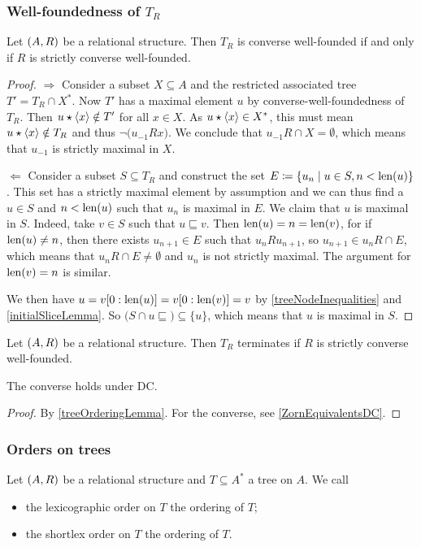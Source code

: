 \subsubsection{Well-foundedness of $T_R$}
\begin{proposition}
Let $\sSet{A, R}$ be a relational structure. Then $T_R$ is converse well-founded \textup{if and only if} $R$ is strictly converse well-founded.
\end{proposition}
\begin{proof}
$\boxed{\Rightarrow}$ Consider a subset $X\subseteq A$ and the restricted associated tree $T' = T_R\cap{X^*}$. Now $T'$ has a maximal element $u$ by converse-well-foundedness of $T_R$. Then $u\star\left\langle x \right\rangle \notin T'$ for all $x\in X$. As $u\star\left\langle x \right\rangle \in X^*$, this must mean $u\star\left\langle x \right\rangle\notin T_R$ and thus $\neg\big(u_{-1}Rx\big)$. We conclude that $u_{-1}R\cap X = \emptyset$, which means that $u_{-1}$ is strictly maximal in $X$.

$\boxed{\Leftarrow}$ Consider a subset $S\subseteq T_R$ and construct the set $E \defeq \setbuilder{u_n}{u\in S, n<\len(u)}$. This set has a strictly maximal element by assumption and we can thus find a $u\in S$ and $n<\operatorname{len}(u)$ such that $u_{n}$ is maximal in $E$. We claim that $u$ is maximal in $S$. Indeed, take $v\in S$ such that $u\sqsubseteq v$. Then $\operatorname{len}(u) = n = \operatorname{len}(v)$, for if $\operatorname{len}(u) \neq n$, then there exists $u_{n+1}\in E$ such that $u_nRu_{n+1}$, so $u_{n+1}\in u_nR\cap E$, which means that $u_nR\cap E\neq \emptyset$ and $u_n$ is not strictly maximal. The argument for $\operatorname{len}(v) = n$ is similar.

We then have $u = v[0:\operatorname{len}(u)] = v[0:\operatorname{len}(v)] = v$ by \ref{treeNodeInequalities} and \ref{initialSliceLemma}. So $\big(S\cap u{\sqsubseteq}\big) \subseteq \{u\}$, which means that $u$ is maximal in $S$.
\end{proof}
\begin{corollary} \label{welfoundedACC}
Let $\sSet{A, R}$ be a relational structure. Then $T_R$ terminates if $R$ is strictly converse well-founded.

The converse holds under DC.
\end{corollary}
\begin{proof}
By \ref{treeOrderingLemma}. For the converse, see \ref{ZornEquivalentsDC}.
\end{proof}

\subsubsection{Orders on trees}
\begin{definition}
Let $\sSet{A,R}$ be a relational structure and $T\subseteq A^*$ a tree on $A$. We call
\begin{itemize}
\item the lexicographic order on $T$ the  ordering of $T$;
\item the shortlex order on $T$ the  ordering of $T$.
\end{itemize}
\end{definition}

